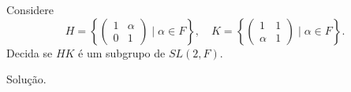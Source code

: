 \begin{homeworkProblem}
  Considere
\[
H = \left\{
\begin{pmatrix}
1 & \alpha \\
0 & 1
\end{pmatrix}
\mid \alpha \in F
\right\}, \quad
K = \left\{
\begin{pmatrix}
1 & 1 \\
\alpha & 1
\end{pmatrix}
\mid \alpha \in F
\right\}.
\]
Decida se $HK$ é um subgrupo de $SL(2,F)$.
  \begin{solution}
    Solução.
  \end{solution}
\end{homeworkProblem}
